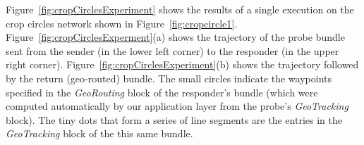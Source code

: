 
Figure~\ref{fig:cropCirclesExperiment} shows the results of a single
execution on the crop circles network shown in
Figure~\ref{fig:cropcircle1}. Figure~\ref{fig:cropCirclesExperment}(a)
shows the trajectory of the probe bundle sent from the sender (in the
lower left corner) to the responder (in the upper right
corner). Figure~\ref{fig:cropCirclesExperiment}(b) shows the
trajectory followed by the return (geo-routed) bundle. The small
circles indicate the waypoints specified in the {\em GeoRouting} block
of the responder's bundle (which were computed automatically by our
application layer from the probe's {\em GeoTracking} block). The tiny
dots that form a series of line segments are the entries in the {\em
  GeoTracking} block of the this same bundle. 

